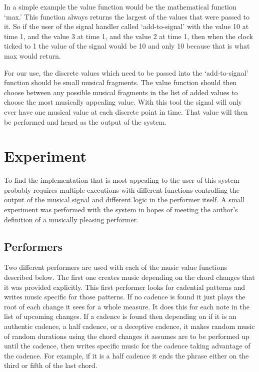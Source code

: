 \documentclass[12pt]{ucthesis}
\begin{document}
{In a simple example the value function would be the mathematical function `max.' This function always returns the largest of the values that were passed to it. So if the user of the signal handler called `add-to-signal' with the value 10 at time 1, and the value 3 at time 1, and the value 2 at time 1, then when the clock ticked to 1 the value of the signal would be 10 and only 10 because that is what max would return. 

For our use, the discrete values which need to be passed into the `add-to-signal' function should be small musical fragments. The value function should then choose between any possible musical fragments in the list of added values to choose the most musically appealing value.  With this tool the signal will only ever have one musical value at each discrete point in time. That value will then be performed and heard as the output of the system. 

\chapter{Experiment}
\label {experiment}
To find the implementation that is most appealing to the user of this system probably requires multiple executions with different functions controlling the output of the musical signal and different logic in the performer itself. A small experiment was performed with the system in hopes of meeting the author's definition of a musically pleasing performer. 

\section{Performers}
\label {performers}

Two different performers are used with each of the music value functions described below. The first one creates music depending on the chord changes that it was provided explicitly. This first performer looks for cadential patterns and writes music specific for those patterns. If no cadence is found it just plays the root of each change it sees for a whole measure. It does this for each note in the list of upcoming changes. If a cadence is found then depending on if it is an authentic cadence, a half cadence, or a deceptive cadence, it makes random music of random durations using the chord changes it assumes are to be performed up until the cadence, then writes specific music for the cadence taking advantage of the cadence. For example, if it is a half cadence it ends the phrase either on the third or fifth of the last chord.

}
\end{document}

